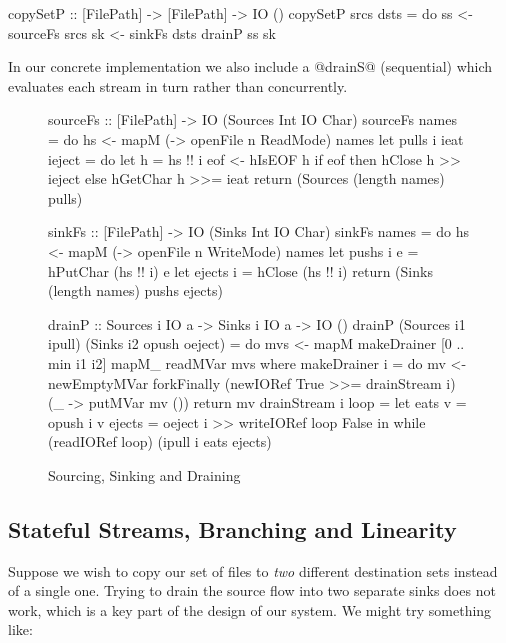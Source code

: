 \begin{code}
 copySetP :: [FilePath] -> [FilePath] -> IO ()
 copySetP srcs dsts
  = do  ss <- sourceFs srcs
        sk <- sinkFs   dsts
        drainP ss sk
\end{code}

In our concrete implementation we also include a @drainS@ (sequential) which evaluates each stream in turn rather than concurrently.
\begin{figure}
\begin{code}
sourceFs :: [FilePath] -> IO (Sources Int IO Char)
sourceFs names 
 = do hs <- mapM (\n -> openFile n ReadMode) names
      let pulls i ieat ieject
          = do let h = hs !! i
               eof <- hIsEOF h
               if eof then hClose   h >> ieject
                      else hGetChar h >>= ieat
      return (Sources (length names) pulls)

sinkFs  :: [FilePath] -> IO (Sinks Int IO Char)
sinkFs names 
 = do hs <- mapM (\n -> openFile n WriteMode) names
      let pushs  i e = hPutChar (hs !! i) e
      let ejects i   = hClose   (hs !! i)
      return (Sinks (length names) pushs ejects)

drainP :: Sources i IO a -> Sinks i IO a -> IO ()
drainP (Sources i1 ipull) (Sinks i2 opush oeject)
 = do mvs <- mapM makeDrainer [0 .. min i1 i2]
      mapM_ readMVar mvs
 where
  makeDrainer i = do
    mv <- newEmptyMVar
    forkFinally (newIORef True >>= drainStream i)
                (\_ -> putMVar mv ())
    return mv
  drainStream i loop =
    let eats v = opush i v
        ejects = oeject i >> writeIORef loop False
    in  while (readIORef loop) (ipull i eats ejects)
\end{code}

\caption{Sourcing, Sinking and Draining}
\label{f:Draining}
\end{figure}


\subsection{Stateful Streams, Branching and Linearity}
\label{s:Linearity}
Suppose we wish to copy our set of files to \emph{two} different destination sets instead of a single one. Trying to drain the source flow into two separate sinks does not work, which is a key part of the design of our system. We might try something like:

